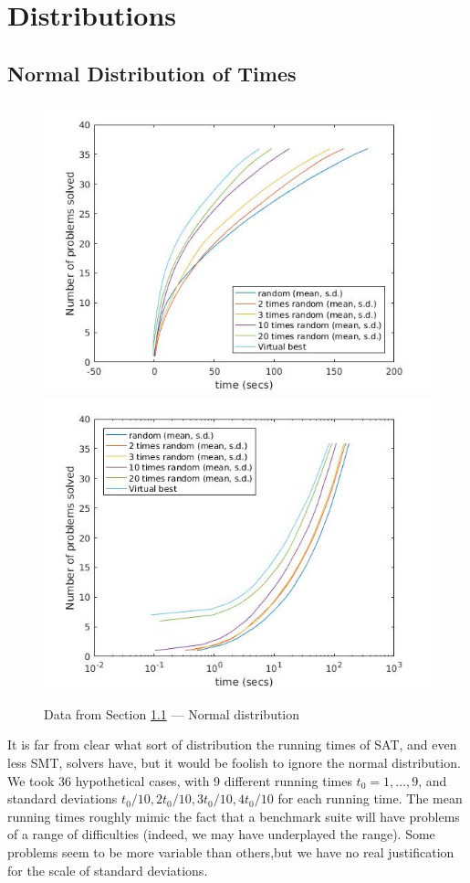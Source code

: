 \documentclass{easychair}
\begin{document}
\section{Distributions}
\subsection{Normal Distribution of Times}\label{sec:Normal}
\begin{figure}[h]
\caption{Data from Section \ref{sec:Normal} --- Normal distribution\label{Fig:Normal}}
\includegraphics[scale=0.4]{RSolve20.jpg}
\includegraphics[scale=0.4]{RlogSolve20.jpg}
\end{figure}
It is far from clear what sort of distribution the running times of SAT, and even less SMT, solvers have, but it would be foolish to ignore the normal distribution. We took 36 hypothetical cases, with 9 different running times $t_0=1,\ldots,9$, and standard deviations $t_0/10,2t_0/10,3t_0/10,4t_0/10$ for each running time. The mean running times roughly mimic the fact that a benchmark suite will have problems of a range of difficulties (indeed, we may have underplayed the range). Some problems seem to be more variable than others,but we have no real justification for the scale of standard deviations.
\end{document}
